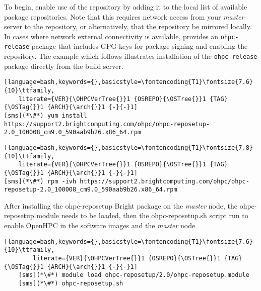 To begin, enable use of the \OHPC{} repository by adding it to the local list
of available package repositories. Note that this requires network access from
your {\em master} server to the \OHPC{} repository, or alternatively, that
the \OHPC{} repository be mirrored locally.  In cases where network external
connectivity is available, \OHPC{} provides an \texttt{ohpc-release} package
that includes GPG keys for package signing and enabling the repository.  The
example which follows illustrates installation of the \texttt{ohpc-release}
package directly from the \OHPC{} build server.

\begin{lstlisting}[language=bash,keywords={},basicstyle=\fontencoding{T1}\fontsize{7.6}{10}\ttfamily,
	literate={VER}{\OHPCVerTree{}}1 {OSREPO}{\OSTree{}}1 {TAG}{\OSTag{}}1 {ARCH}{\arch{}}1 {-}{-}1]
[sms](*\#*) yum install https://support2.brightcomputing.com/ohpc/ohpc-reposetup-2.0_100008_cm9.0_590aab9b26.x86_64.rpm
\end{lstlisting}
\else
\begin{lstlisting}[language=bash,keywords={},basicstyle=\fontencoding{T1}\fontsize{7.8}{10}\ttfamily,
	literate={VER}{\OHPCVerTree{}}1 {OSREPO}{\OSTree{}}1 {TAG}{\OSTag{}}1 {ARCH}{\arch{}}1 {-}{-}1]
[sms](*\#*) rpm -ivh https://support2.brightcomputing.com/ohpc/ohpc-reposetup-2.0_100008_cm9.0_590aab9b26.x86_64.rpm
\end{lstlisting}
\fi

After installing the ohpc-reposetup Bright package on the {\em master} node, the 
ohpc-reposetup module needs to be loaded, then the ohpc-reposetup.sh script run 
to enable OpenHPC in the software images and the {\em master} node

\begin{lstlisting}[language=bash,keywords={},basicstyle=\fontencoding{T1}\fontsize{7.6}{10}\ttfamily,
        literate={VER}{\OHPCVerTree{}}1 {OSREPO}{\OSTree{}}1 {TAG}{\OSTag{}}1 {ARCH}{\arch{}}1 {-}{-}1]
	[sms](*\#*) module load ohpc-reposetup/2.0/ohpc-reposetup.module
	[sms](*\#*) ohpc-reposetup.sh
\end{lstlisting}
